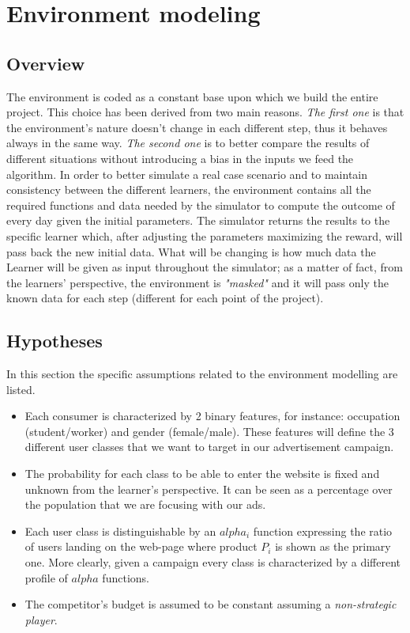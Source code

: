 \chapter{Environment modeling}

\section{Overview}
\label{chap:env_overview}

The environment is coded as a constant base upon which we build the entire project. This choice has been derived from two main reasons. \textit{The first one} is that the environment's nature doesn't change in each different step, thus it behaves always in the same way. \textit{The second one} is to better compare the results of different situations without introducing a bias in the inputs we feed the algorithm.
In order to better simulate a real case scenario and to maintain consistency between the different learners, the environment contains all the required functions and data needed by the simulator to compute the outcome of every day given the initial parameters. The simulator returns the results to the specific learner which, after adjusting the parameters maximizing the reward, will pass back the new initial data.
What will be changing is how much data the Learner will be given as input throughout the simulator; as a matter of fact, from the learners' perspective, the environment is \textit{"masked"} and it will pass only the known data for each step (different for each point of the project).

\section{Hypotheses}
\label{sec:env_hypoteses}

In this section the specific assumptions related to the environment modelling are listed.

\begin{itemize}
    \item Each consumer is characterized by 2 binary features, for instance: occupation (student/worker) and gender (female/male). These features will define the 3 different user classes that we want to target in our advertisement campaign.
    \item The probability for each class to be able to enter the website is fixed and unknown from the learner's perspective. It can be seen as a percentage over the population that we are focusing with our ads.
    \item Each user class is distinguishable by an $alpha_i$ function expressing the ratio of users landing on the web-page where product $P_i$ is shown as the primary one. More clearly, given a campaign every class is characterized by a different profile of $alpha$ functions.
    \item The competitor's budget is assumed to be constant assuming a \textit{non-strategic player}.
\end{itemize}

